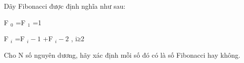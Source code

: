 Dãy Fibonacci được định nghĩa như sau:  

   F   $_    0   $   =F   $_    1   $   =1  

   F   $_    i   $   =F   $_    i-1   $   +F   $_    i-2   $   ­, i≥2  

   Cho N số nguyên dương, hãy xác định mỗi số đó có là số Fibonacci hay không.